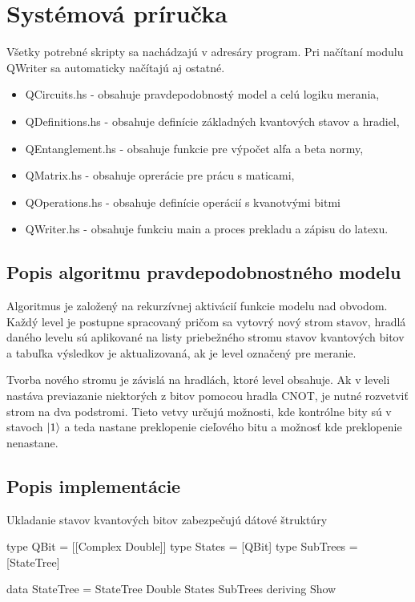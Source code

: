 
\chapter{Systémová príručka}

Všetky potrebné skripty sa nachádzajú v adresáry program. Pri načítaní modulu
QWriter sa automaticky načítajú aj ostatné. 
\begin{itemize}
    \item QCircuits.hs - obsahuje pravdepodobnostý model a celú logiku merania,
    \item QDefinitions.hs - obsahuje definície základných kvantových stavov a
hradiel,
    \item QEntanglement.hs - obsahuje funkcie pre výpočet alfa a beta normy,
    \item QMatrix.hs - obsahuje oprerácie pre prácu s maticami,
    \item QOperations.hs - obsahuje definície operácií s kvanotvými bitmi
    \item QWriter.hs - obsahuje funkciu main a proces prekladu a zápisu do
latexu.
\end{itemize}

\section{Popis algoritmu pravdepodobnostného modelu}

Algoritmus je založený na rekurzívnej aktivácií funkcie modelu nad obvodom.
Každý level je postupne spracovaný pričom sa vytovrý nový strom stavov, hradlá
daného levelu sú aplikované na listy priebežného stromu stavov kvantových bitov
a tabuľka výsledkov je aktualizovaná, ak je level označený pre meranie.

Tvorba nového stromu je závislá na hradlách, ktoré level obsahuje. Ak v leveli
nastáva previazanie niektorých z bitov pomocou hradla CNOT, je nutné rozvetviť
strom na dva podstromi. Tieto vetvy určujú možnosti, kde kontrólne bity sú
v stavoch \(\ket{1}\) a teda nastane preklopenie cieľového bitu a možnosť
kde preklopenie nenastane.

\section{Popis implementácie}

Ukladanie stavov kvantových bitov zabezpečujú dátové štruktúry
\begin{code}
type QBit = [[Complex Double]]
type States = [QBit]
type SubTrees = [StateTree]

data StateTree = StateTree Double States SubTrees deriving Show
\end{code}

